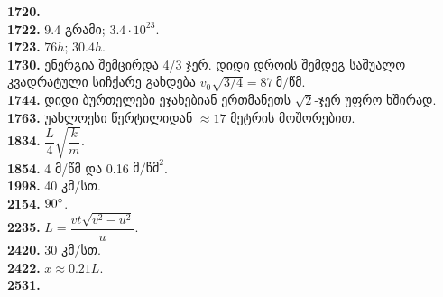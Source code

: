 \documentclass[12pt,a4paper,]{report}
\begin{document}
\textbf{1720.} \\
\textbf{1722.} 9.4 გრამი; $3.4 \cdot 10^{23}$.\\
\textbf{1723.} $76h$; $30.4h$.\\
\textbf{1730.} ენერგია შემცირდა 4/3 ჯერ. დიდი დროის შემდეგ საშუალო კვადრატული სიჩქარე გახდება $v_0 \sqrt{3/4} = 87\ \text{მ/წმ}$. \\
\textbf{1744.} დიდი ბურთელები ეჯახებიან ერთმანეთს $\sqrt{2}$-ჯერ უფრო ხშირად. \\
\textbf{1763.} უახლოესი წერტილიდან $\approx 17$ მეტრის მოშორებით. \\
\textbf{1834.} $\dfrac{L}{4}\sqrt{\dfrac{k}{m}}$. \\
\textbf{1854.} 4 მ/წმ და 0.16 $\text{მ}/\text{წმ}^2$. \\
\textbf{1998.} 40 კმ/სთ. \\
\textbf{2154.} $90 \degree$. \\
\textbf{2235.} $L=\dfrac{vt\sqrt{v^2-u^2}}{u}$. \\
\textbf{2420.} 30 კმ/სთ. \\
\textbf{2422.} $x\approx0.21L$. \\
\textbf{2531.} 
\end{document}
